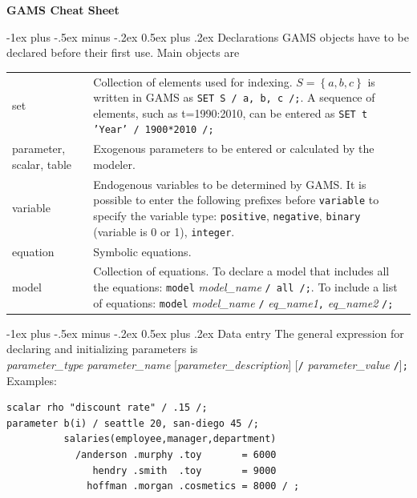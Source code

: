 \documentclass[10pt,landscape,a4paper]{article}
\makeatletter
\renewcommand{\section}{\@startsection{section}{1}{0mm}%
                                {-1ex plus -.5ex minus -.2ex}%
                                {0.5ex plus .2ex}%
                                {\color{blue}\normalfont\large\bfseries}}
\makeatother
\begin{document}
\raggedright
\footnotesize
\begin{multicols}{2}


\setlength{\premulticols}{1pt}
\setlength{\postmulticols}{1pt}
\setlength{\multicolsep}{1pt}
\setlength{\columnsep}{2pt}

\begin{center}
     \Large{\textbf{GAMS Cheat Sheet}} \\
\end{center}

\section{Declarations}
GAMS objects have to be declared before their first use. Main objects are\\
\begin{tabularx}{\columnwidth}{@{}>{\ttfamily}l>{\raggedright\arraybackslash}X@{}}
  set & Collection of elements used for indexing. $S=\left\{a,b,c\right\}$ is
  written in GAMS as \texttt{SET S / a, b, c /;}. A sequence of elements, such
  as t=1990:2010, can be entered as
  \texttt{SET t 'Year' / 1900*2010 /;}\\
  parameter\textrm{, }scalar\textrm{, }table & Exogenous parameters to be
  entered
  or calculated by the modeler. \\
  variable & Endogenous variables to be determined by GAMS. It is possible to
  enter the following prefixes before \texttt{variable} to specify the variable
  type:
  \texttt{positive}, \texttt{negative}, \texttt{binary} (variable is 0 or 1), \texttt{integer}.\\
  equation   & Symbolic equations. \\
  model & Collection of equations. To declare a model that includes all the
  equations:\linebreak{} \texttt{model} \emph{model\_name} \texttt{/ all
    /;}. \linebreak{}To include a list of equations:\linebreak{} \texttt{model}
  \emph{model\_name} \texttt{/} \emph{eq\_name1}\texttt{,} \emph{eq\_name2}
  \texttt{/;}
\end{tabularx}

\section{Data entry}
The general expression for declaring and initializing parameters is\\
\emph{parameter\_type} \emph{parameter\_name} [\emph{parameter\_description}] [\verb!/!
\emph{parameter\_value} \verb!/!]\verb!;!\\
Examples:
\begin{verbatim}
scalar rho "discount rate" / .15 /;
parameter b(i) / seattle 20, san-diego 45 /;
          salaries(employee,manager,department)
            /anderson .murphy .toy       = 6000
               hendry .smith  .toy       = 9000
              hoffman .morgan .cosmetics = 8000 / ;
\end{verbatim}


\end{multicols}
\end{document}
